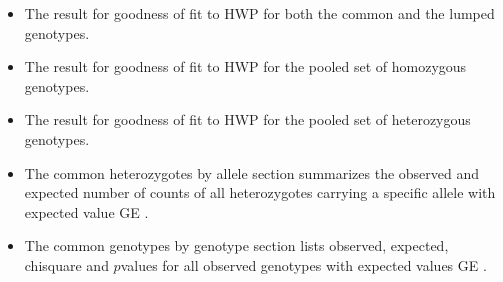 \documentclass[letterpaper,10pt,english,openany,oneside]{sphinxmanual}
\begin{document}
\begin{itemize}
\sphinxAtStartPar
If the sum of expected counts in the lumped class does not add up to
, then the test for the lumped genotypes cannot be
calculated and the following message is reported:

\begin{sphinxVerbatim}[commandchars=\\\{\}]
The total number of expected genotypes is less than 5
\end{sphinxVerbatim}

\sphinxAtStartPar
This may by remedied by combining rare alleles and recalculating
overall chi\sphinxhyphen{}square value and degrees of freedom. (This would require
appropriate manipulation of the data set by hand and is not a feature
of PyPop).

\item {} 
\sphinxAtStartPar
{}

\sphinxAtStartPar
The result for goodness of fit to HWP for both the common and the
lumped genotypes.

\item {} 
\sphinxAtStartPar
{}

\sphinxAtStartPar
The result for goodness of fit to HWP for the pooled set of
homozygous genotypes.

\item {} 
\sphinxAtStartPar
{}

\sphinxAtStartPar
The result for goodness of fit to HWP for the pooled set of
heterozygous genotypes.

\item {} 
\sphinxAtStartPar
{}

\sphinxAtStartPar
The common heterozygotes by allele section summarizes the observed
and expected number of counts of all heterozygotes carrying a
specific allele with expected value GE .

\item {} 
\sphinxAtStartPar
{}

\sphinxAtStartPar
The common genotypes by genotype section lists observed, expected,
chi\sphinxhyphen{}square and \(p\)\sphinxhyphen{}values for all observed genotypes with expected
values GE .

\end{itemize}
\end{document}
